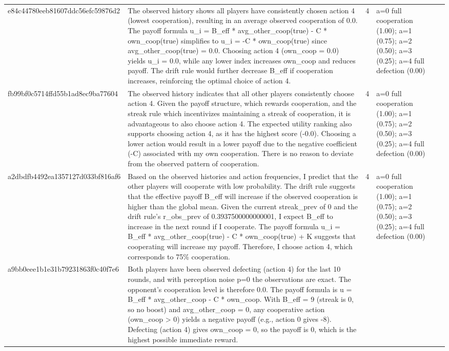 \begin{tabular}{lp{8cm}ll l}
e84c44780eeb81607ddc56efc59876d2 & The observed history shows all players have consistently chosen action 4 (lowest cooperation), resulting in an average observed cooperation of 0.0. The payoff formula u\_i = B\_eff * avg\_other\_coop(true) - C * own\_coop(true) simplifies to u\_i = -C * own\_coop(true) since avg\_other\_coop(true) = 0.0. Choosing action 4 (own\_coop = 0.0) yields u\_i = 0.0, while any lower index increases own\_coop and reduces payoff. The drift rule would further decrease B\_eff if cooperation increases, reinforcing the optimal choice of action 4. & 4 & a=0 full cooperation (1.00); a=1 (0.75); a=2 (0.50); a=3 (0.25); a=4 full defection (0.00) &  \\
fb99bf0c5714ffd55b1ad8ec9ba77604 & The observed history indicates that all other players consistently choose action 4. Given the payoff structure, which rewards cooperation, and the streak rule which incentivizes maintaining a streak of cooperation, it is advantageous to also choose action 4. The expected utility ranking also supports choosing action 4, as it has the highest score (-0.0). Choosing a lower action would result in a lower payoff due to the negative coefficient (-C) associated with my own cooperation. There is no reason to deviate from the observed pattern of cooperation. & 4 & a=0 full cooperation (1.00); a=1 (0.75); a=2 (0.50); a=3 (0.25); a=4 full defection (0.00) &  \\
a2dbdfb4492ea1357127d033bf816af6 & Based on the observed histories and action frequencies, I predict that the other players will cooperate with low probability. The drift rule suggests that the effective payoff B\_eff will increase if the observed cooperation is higher than the global mean. Given the current streak\_prev of 0 and the drift rule's r\_obs\_prev of 0.3937500000000001, I expect B\_eff to increase in the next round if I cooperate. The payoff formula u\_i = B\_eff * avg\_other\_coop(true) - C * own\_coop(true) + K suggests that cooperating will increase my payoff. Therefore, I choose action 4, which corresponds to 75\% cooperation. & 4 & a=0 full cooperation (1.00); a=1 (0.75); a=2 (0.50); a=3 (0.25); a=4 full defection (0.00) &  \\
a9bb0eee1b1e31b79231863f0c40f7e6 & Both players have been observed defecting (action 4) for the last 10 rounds, and with perception noise p=0 the observations are exact. The opponent's cooperation level is therefore 0.0. The payoff formula is u = B\_eff * avg\_other\_coop - C * own\_coop. With B\_eff = 9 (streak is 0, so no boost) and avg\_other\_coop = 0, any cooperative action (own\_coop > 0) yields a negative payoff (e.g., action 0 gives -8). Defecting (action 4) gives own\_coop = 0, so the payoff is 0, which is the highest possible immediate reward.


\end{tabular}
